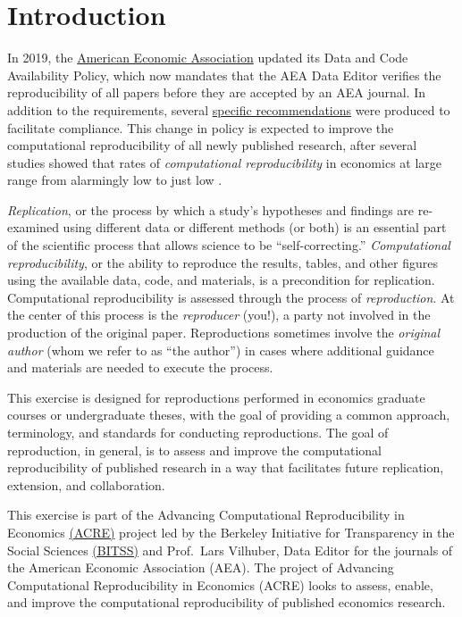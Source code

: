 \documentclass[]{book}
\begin{document}
\hypertarget{intro}{%
\chapter*{Introduction}\label{intro}}

In 2019, the \href{https://www.aeaweb.org/journals/policies/data-code/}{American Economic Association} updated its Data and Code Availability Policy, which now mandates that the AEA Data Editor verifies the reproducibility of all papers before they are accepted by an AEA journal. In addition to the requirements, several \href{https://aeadataeditor.github.io/aea-de-guidance/}{specific recommendations} were produced to facilitate compliance. This change in policy is expected to improve the computational reproducibility of all newly published research, after several studies showed that rates of \emph{computational reproducibility} in economics at large range from alarmingly low \citep{galiani2018make, chang2015economics} to just low \citep{kingi2018reproducibility}.

\emph{Replication}, or the process by which a study's hypotheses and findings are re-examined using different data or different methods (or both) \citep{King95} is an essential part of the scientific process that allows science to be ``self-correcting.'' \emph{Computational reproducibility}, or the ability to reproduce the results, tables, and other figures using the available data, code, and materials, is a precondition for replication. Computational reproducibility is assessed through the process of \emph{reproduction}. At the center of this process is the \emph{reproducer} (you!), a party not involved in the production of the original paper. Reproductions sometimes involve the \emph{original author} (whom we refer to as ``the author'') in cases where additional guidance and materials are needed to execute the process.

This exercise is designed for reproductions performed in economics graduate courses or undergraduate theses, with the goal of providing a common approach, terminology, and standards for conducting reproductions. The goal of reproduction, in general, is to assess and improve the computational reproducibility of published research in a way that facilitates future replication, extension, and collaboration.

This exercise is part of the Advancing Computational Reproducibility in Economics \href{https://www.bitss.org/ecosystem/acre/}{(ACRE)} project led by the Berkeley Initiative for Transparency in the Social Sciences \href{bitss.org}{(BITSS)} and Prof.~Lars Vilhuber, Data Editor for the journals of the American Economic Association (AEA). The project of Advancing Computational Reproducibility in Economics (ACRE) looks to assess, enable, and improve the computational reproducibility of published economics research.
\end{document}
